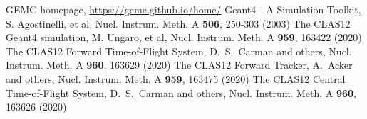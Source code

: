 %
% 
%
%
\begin{thebibliography}{}
%
%
GEMC homepage, \url{https://gemc.github.io/home/}
%
Geant4 - A Simulation Toolkit, S. Agostinelli, et al, Nucl. Instrum. Meth. A \textbf{506}, 250-303 (2003)
%
The CLAS12 Geant4 simulation, M. Ungaro, et al, Nucl. Instrum. Meth. A \textbf{959}, 163422 (2020)
%
The CLAS12 Forward Time-of-Flight System, D.~S.~Carman and others, Nucl. Instrum. Meth. A \textbf{960}, 163629 (2020)
%
The CLAS12 Forward Tracker, A.~Acker and others, Nucl. Instrum. Meth. A \textbf{959}, 163475 (2020)
%
The CLAS12 Central Time-of-Flight System, D.~S.~Carman and others, Nucl. Instrum. Meth. A \textbf{960}, 163626 (2020)
%
\end{thebibliography}


